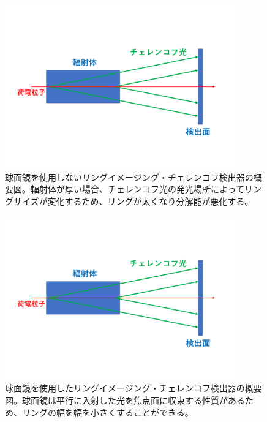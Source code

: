 \begin{figure}[htbp]
  \centering
  \includegraphics[width=10cm, page=1]{images/chapter2/SphericalMirror.pdf}
  \caption{球面鏡を使用しないリングイメージング・チェレンコフ検出器の概要図。輻射体が厚い場合、チェレンコフ光の発光場所によってリングサイズが変化するため、リングが太くなり分解能が悪化する。}
  \label{fig:SphericalMirror1}
\end{figure}
\begin{figure}[htbp]
  \centering
  \includegraphics[width=10cm, page=2]{images/chapter2/SphericalMirror.pdf}
  \caption{球面鏡を使用したリングイメージング・チェレンコフ検出器の概要図。球面鏡は平行に入射した光を焦点面に収束する性質があるため、リングの幅を幅を小さくすることができる。}
  \label{fig:SphericalMirror2}
\end{figure}

